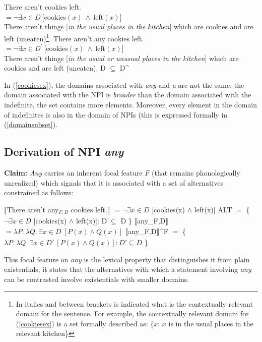 \documentclass[a4paper,11pt]{article}
\newcommand{\reff}[1]{(\ref{#1})}
\newcommand{\eval}[2][]{$\llbracket$#2$\rrbracket_{#1}$}
\newcommand{\exs}[2][]{\begin{exe}\ex #1 \begin{xlist}#2\end{xlist}\end{exe}}
\begin{document}
\exs[\label{cookiesex}]{
  \ex There aren't cookies\rb{} left.\\
                       $= \neg \exists{x \in D}~[$cookies$(x)~\wedge~$left$(x)]$\\
                       There aren't things [\emph{in the usual places in the kitchen}] which are cookies and are left (uneaten)\footnote{In italics and between brackets is indicated what is the contextually relevant domain for the sentence. For example, the contextually relevant domain for \reff{cookiesex} is a set formally described as: \{$x$: $x$ is in the usual places in the relevant kitchen\}}.
  \ex There aren't \lb{DP,~D^{\prime}}any cookies\rb{} left.\\
      $= \neg \exists{x \in D^{\prime}}~[$cookies$(x)~\wedge~$left$(x)]$\\
      There aren't things [\emph{in the usual or unusual places in the kitchen}] which are cookies and are left (uneaten).
  \ex\label{domainsubset} D $\subseteq$ D^{\prime}
}
%
In \reff{cookiesex}, the domains associated with \emph{any} and \emph{a} are not the same: the domain associated with the NPI is \emph{broader} than the domain associated with the indefinite, the set contains more elements. Moreover, every element in the domain of indefinites is also in the domain of NPIs (this is expressed formally in \reff{domainsubset}.


\subsection{Derivation of NPI \textit{any}}
\textbf{Claim:} \emph{Any} carries an inherent focal feature $F$ (that remains phonologically unrealized) which signals that it is associated with a set of alternatives constrained as follows:

\begin{exe}
  \ex\label{derivany}
    \begin{xlist}
      \ex\label{derivanya} \eval{There aren't any$_{F,D}$ cookies left.} $= \neg\exists x \in D$ [cookies(x) $\wedge$ left(x)]
      \ex\label{derivanyb} ALT $=$ \{$\neg\exists x \in D$ [cookies(x) $\wedge$ left(x)]: D'$\subseteq$ D \}
      \ex\label{derivanyc} \eval{any_{F,D}} $= \lambda{P}.~\lambda{Q}.~\exists{x} \in D~[P(x)\wedge Q(x)]$
      \ex\label{derivanyd} \eval{any_{F,D}}^F $=$ \{$\lambda{P}.~\lambda{Q}.~\exists{x} \in D'~[P(x)\wedge Q(x)]:D'\subseteq D$ \}
    \end{xlist}
\end{exe}
%
This focal feature on \textit{any} is the lexical property that distinguishes it from plain existentials; it states that the alternatives with which a statement involving \textit{any} can be contrasted involve existentials with smaller domains.
\end{document}
